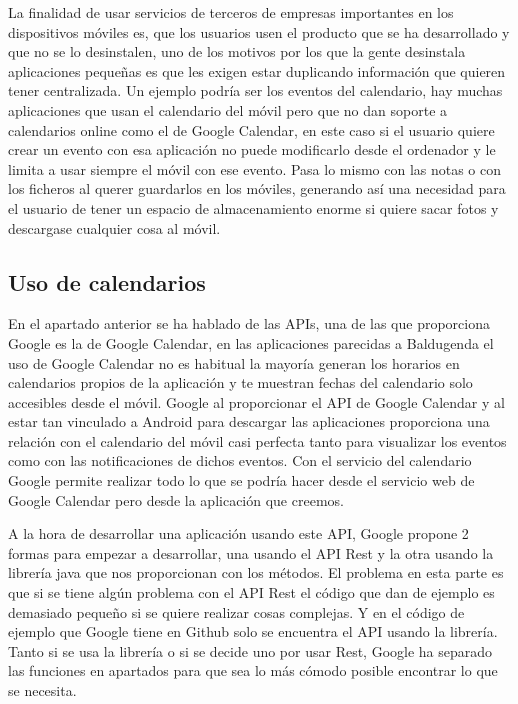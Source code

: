La finalidad de usar servicios de terceros de empresas importantes en los dispositivos móviles es, que los usuarios usen el producto que se ha desarrollado y que no se lo desinstalen, uno de los motivos por los que la gente desinstala aplicaciones pequeñas es que les exigen estar duplicando información que quieren tener centralizada. Un ejemplo podría ser los eventos del calendario, hay muchas aplicaciones que usan el calendario del móvil pero que no dan soporte a calendarios online como el de Google Calendar, en este caso si el usuario quiere crear un evento con esa aplicación no puede modificarlo desde el ordenador y le limita a usar siempre el móvil con ese evento.
Pasa lo mismo con las notas o con los ficheros al querer guardarlos en los móviles, generando así una necesidad para el usuario de tener un espacio de almacenamiento enorme si quiere sacar fotos y descargase cualquier cosa al móvil.

\subsection{Uso de calendarios}
\label{subsecc:Uso de calendarios}

En el apartado anterior se ha hablado de las APIs,  una de las que proporciona Google es la de Google Calendar, en las aplicaciones parecidas a Baldugenda el uso de Google Calendar no es habitual la mayoría generan los horarios en calendarios propios de la aplicación y te muestran fechas del calendario solo accesibles desde el móvil.
Google al proporcionar el API de Google Calendar y al estar tan vinculado a Android para descargar las aplicaciones proporciona una relación con el calendario del móvil casi perfecta tanto para visualizar los eventos como con las notificaciones de dichos eventos.
Con el servicio del calendario Google permite realizar todo lo que se podría hacer desde el servicio web de Google Calendar pero desde la aplicación que creemos.

A la hora de desarrollar una aplicación usando este API, Google propone 2 formas para empezar a desarrollar, una usando el API Rest y la otra usando la librería java que nos proporcionan con los métodos.
El problema en esta parte es que si se tiene algún problema con el API Rest el código que dan de ejemplo es demasiado pequeño si se quiere realizar cosas complejas. Y en el código de ejemplo que Google tiene en \gls{Github} solo se encuentra el API usando la librería.
Tanto si se usa la librería o si se decide uno por usar Rest, Google ha separado las funciones en apartados para que sea lo más cómodo posible encontrar lo que se necesita.

